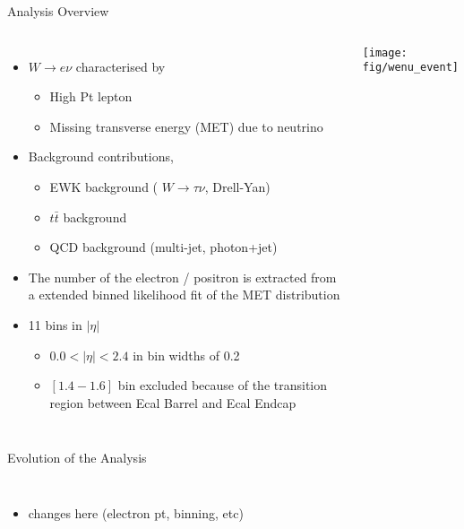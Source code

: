 \documentclass[t, 8pt]{beamer}
\begin{document}
\begin{frame}{Analysis Overview}
  \begin{columns}[c]
  \begin{itemize}
    \item $W \to e\nu$ characterised by 
    \begin{itemize}
      \item High Pt lepton 
      \item Missing transverse energy (MET) due to neutrino
    \end{itemize}
    \item Background contributions,
    \begin{itemize}
      \item EWK background ( $W \to \tau\nu$, Drell-Yan)
      \item $t\bar{t}$ background
      \item QCD background (multi-jet, photon+jet)
    \end{itemize}
    \item The number of the electron / positron is extracted from a extended binned likelihood fit of the MET distribution
    \item 11 bins in $|\eta|$
    \begin{itemize}
      \item $0.0 < |\eta| < 2.4$ in bin widths of 0.2
      \item $[1.4-1.6]$ bin excluded because of the transition region between Ecal Barrel and Ecal Endcap
    \end{itemize}
  \end{itemize}
    \texttt{[image: fig/wenu\_event]}
  \end{columns}
\end{frame}

\begin{frame}{Evolution of the Analysis}
  \begin{columns}[c]
    \begin{itemize}
      \item changes here (electron pt, binning, etc)
    \end{itemize}
  \end{columns}
\end{frame}
\end{document}
